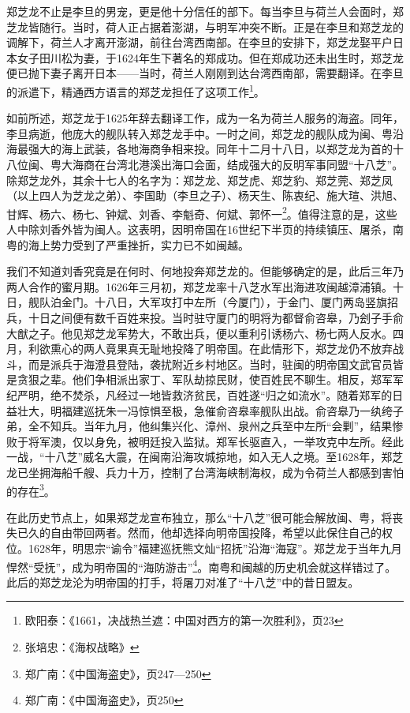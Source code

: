 郑芝龙不止是李旦的男宠，更是他十分信任的部下。每当李旦与荷兰人会面时，郑芝龙皆随行。当时，荷人正占据着澎湖，与明军冲突不断。正是在李旦和郑芝龙的调解下，荷兰人才离开澎湖，前往台湾西南部。在李旦的安排下，郑芝龙娶平户日本女子田川松为妻，于1624年生下著名的郑成功。但在郑成功还未出生时，郑芝龙便已抛下妻子离开日本——当时，荷兰人刚刚到达台湾西南部，需要翻译。在李旦的派遣下，精通西方语言的郑芝龙担任了这项工作\footnote{欧阳泰：《1661，决战热兰遮：中国对西方的第一次胜利》，页23}。

如前所述，郑芝龙于1625年辞去翻译工作，成为一名为荷兰人服务的海盗。同年，李旦病逝，他庞大的舰队转入郑芝龙手中。一时之间，郑芝龙的舰队成为闽、粤沿海最强大的海上武装，各地海商争相来投。同年十二月十八日，以郑芝龙为首的十八位闽、粤大海商在台湾北港溪出海口会面，结成强大的反明军事同盟“十八芝”。除郑芝龙外，其余十七人的名字为：郑芝龙、郑芝虎、郑芝豹、郑芝莞、郑芝凤（以上四人为芝龙之弟）、李国助（李旦之子）、杨天生、陈衷纪、施大瑄、洪旭、甘辉、杨六、杨七、钟斌、刘香、李魁奇、何斌、郭怀一\footnote{张培忠：《海权战略》}。值得注意的是，这些人中除刘香外皆为闽人。这表明，因明帝国在16世纪下半页的持续镇压、屠杀，南粤的海上势力受到了严重挫折，实力已不如闽越。

我们不知道刘香究竟是在何时、何地投奔郑芝龙的。但能够确定的是，此后三年乃两人合作的蜜月期。1626年三月初，郑芝龙率十八芝水军出海进攻闽越漳浦镇。十日，舰队泊金门。十八日，大军攻打中左所（今厦门），于金门、厦门两岛竖旗招兵，十日之间便有数千百姓来投。当时驻守厦门的明将为都督俞咨皋，乃刽子手俞大猷之子。他见郑芝龙军势大，不敢出兵，便以重利引诱杨六、杨七两人反水。四月，利欲熏心的两人竟果真无耻地投降了明帝国。在此情形下，郑芝龙仍不放弃战斗，而是派兵于海澄县登陆，袭扰附近乡村地区。当时，驻闽的明帝国文武官员皆是贪狠之辈。他们争相派出家丁、军队劫掠民财，使百姓民不聊生。相反，郑军军纪严明，绝不焚杀，凡经过一地皆救济贫民，百姓遂“归之如流水”。随着郑军的日益壮大，明福建巡抚朱一冯惊惧至极，急催俞咨皋率舰队出战。俞咨皋乃一纨绔子弟，全不知兵。当年九月，他纠集兴化、漳州、泉州之兵至中左所“会剿”，结果惨败于将军澳，仅以身免，被明廷投入监狱。郑军长驱直入，一举攻克中左所。经此一战，“十八芝”威名大震，在闽南沿海攻城掠地，如入无人之境。至1628年，郑芝龙已坐拥海船千艘、兵力十万，控制了台湾海峡制海权，成为令荷兰人都感到害怕的存在\footnote{郑广南：《中国海盗史》，页247—250}。

在此历史节点上，如果郑芝龙宣布独立，那么“十八芝”很可能会解放闽、粤，将丧失已久的自由带回两者。然而，他却选择向明帝国投降，希望以此保住自己的权位。1628年，明思宗“谕令”福建巡抚熊文灿“招抚”沿海“海寇”。郑芝龙于当年九月悍然“受抚”，成为明帝国的“海防游击”\footnote{郑广南：《中国海盗史》，页250}。南粤和闽越的历史机会就这样错过了。此后的郑芝龙沦为明帝国的打手，将屠刀对准了“十八芝”中的昔日盟友。


